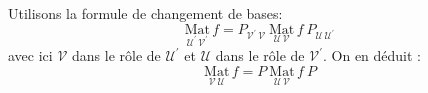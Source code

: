 Utilisons la formule de changement de bases:
\begin{displaymath}
 \underset{\mathcal{U}^\prime\, \mathcal{V}^\prime}{\mathrm{Mat}}\,f =
P_{\mathcal{V}^\prime\, \mathcal{V}}\:
\underset{\mathcal{U}\, \mathcal{V}}{\mathrm{Mat}}\,f \:
P_{\mathcal{U}\, \mathcal{U}^\prime}
\end{displaymath}
avec ici $\mathcal V$ dans le rôle de $\mathcal U ^\prime$ et $\mathcal U$ dans le rôle de $\mathcal V ^\prime$. On en déduit :
\begin{displaymath}
 \underset{\mathcal{V}\, \mathcal{U}}{\mathrm{Mat}}\,f =
P\:
\underset{\mathcal{U}\, \mathcal{V}}{\mathrm{Mat}}\,f \:
P 
\end{displaymath}
